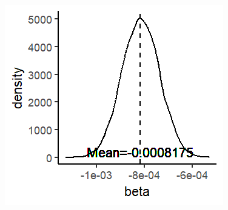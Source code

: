 \documentclass[xcolor=x11names,compress]{beamer}\usepackage[]{graphicx}\usepackage[]{color}
\makeatletter
\def\maxwidth{ %
  \ifdim\Gin@nat@width>\linewidth
    \linewidth
  \else
    \Gin@nat@width
  \fi
}
\newenvironment{knitrout}{}{} %
\renewcommand{\(}{\begin{columns}}
\renewcommand{\)}{\end{columns}}
\newcommand{\<}[1]{\begin{column}{#1}}
\renewcommand{\>}{\end{column}}
\makeatother
\begin{document}
\begin{frame}
\begin{multicols}{2}
\columnbreak
\begin{knitrout}
\color{fgcolor}
\includegraphics[width=\maxwidth]{figure/beta_dist_2-1} 

\end{knitrout}
\end{multicols}
\end{frame}
\end{document}
